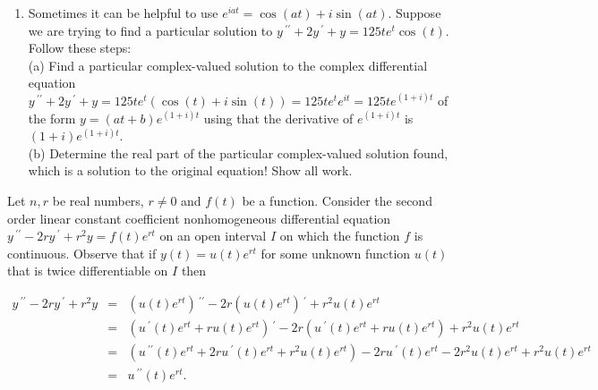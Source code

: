 \documentclass{ximera}
\begin{document}
\begin{enumerate}[label=(\arabic*)]




\newpage

\item Sometimes it can be helpful to use $e^{iat}=\cos{(at)}+i\sin{(at)}$.  Suppose we are trying to find a particular solution to $y\,^{\prime\prime}+2y\,^{\prime}+y=125te^t \cos{(t)}$.  Follow these steps:  \\  (a) Find a particular complex-valued solution to the complex differential equation $y\,^{\prime\prime}+2y\,^{\prime}+y=125te^t (\cos{(t)}+i\sin{(t)})=125te^t e^{it}=125t e^{(1+i)t}$ of the form $y=(at+b) e^{(1+i)t}$ using that the derivative of $e^{(1+i)t}$ is $(1+i)e^{(1+i)t}$.  \\ (b) Determine the real part of the particular complex-valued solution found, which is a solution to the original equation!  Show all work.









\end{enumerate}

\vspace{1cm}

Let $n,r$ be real numbers, $r\neq  0$ and $f(t)$ be a function.  Consider the second order linear constant coefficient nonhomogeneous differential equation\\ $y\,^{\prime\prime}-2r y\,^{\prime}+r^2 y=f(t) e^{rt}$ on an open interval $I$ on which the function $f$ is continuous.  Observe that if $y(t)=u(t)e^{rt}$ for some unknown function $u(t)$ that is twice differentiable on $I$ then

\begin{eqnarray*}
  y\,^{\prime\prime}-2r y\,^{\prime}+r^2 y &=& (u(t)e^{rt})\,^{\prime\prime}-2r (u(t)e^{rt})\,^{\prime}+r^2 u(t)e^{rt} \\
   &=& (u\,^{\prime}(t)e^{rt}+ru(t)e^{rt})\,^{\prime}-2r (u\,^{\prime}(t)e^{rt}+ru(t)e^{rt})+r^2 u(t)e^{rt} \\
   &=& (u\,^{\prime\prime}(t)e^{rt}+2ru\,^{\prime}(t)e^{rt}+r^2u(t)e^{rt})-2r u\,^{\prime}(t)e^{rt}-2r^2u(t)e^{rt}+r^2 u(t)e^{rt} \\
   &=& u\,^{\prime\prime}(t)e^{rt}.
\end{eqnarray*}
\end{document}
